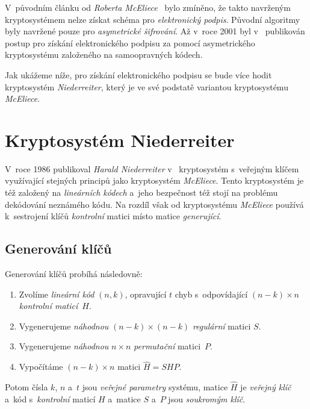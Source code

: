 \documentclass[thesis=M,czech,hidelinks]{FITthesis}[2012/06/26]
\newcommand{\0}{{\textcolor[gray]{0.75}{0}}}
\begin{document}
V~původním článku od \emph{Roberta McEliece}~\cite{McEliece} bylo zmíněno, že
takto navrženým kryptosystémem nelze získat schéma pro \emph{elektronický
podpis}.  Původní algoritmy byly navržené pouze pro \emph{asymetrické
šifrování}. Až v~roce 2001 byl v~\cite{Courtois} publikován postup pro získání
elektronického podpisu za pomocí asymetrického kryptosystému založeného na
samoopravných kódech.

Jak ukážeme níže, pro získání elektronického podpisu se bude více hodit
kryptosystém \emph{Niederreiter}, který je ve své podstatě variantou
kryptosystému \emph{McEliece}.



\section{Kryptosystém Niederreiter}\label{kap_niederreiter}

V~roce 1986 publikoval \emph{Harald Niederreiter} v~\cite{Niederreiter}
kryptosystém s~veřejným klíčem využívající stejných principů jako kryptosystém
\emph{McEliece}. Tento kryptosystém je též založený na \emph{lineárních kódech}
a~jeho bezpečnost též stojí na problému dekódování neznámého kódu. Na rozdíl
však od kryptosystému \emph{McEliece} používá k~sestrojení klíčů
\emph{kontrolní} matici místo matice \emph{generující}.


\subsection{Generování klíčů}

Generování klíčů probíhá následovně:

\begin{enumerate}
    \item Zvolíme \emph{lineární kód} $(n,k)$, opravující $t$ chyb
        s~odpovídající $(n-k) \times n$ \emph{kontrolní maticí}~$H$.
    \item Vygenerujeme \emph{náhodnou} $(n-k) \times (n-k)$ \emph{regulární}
        matici $S$.
    \item Vygenerujeme \emph{náhodnou} $n \times n$ \emph{permutační}
        matici~$P$.
    \item Vypočítáme $(n-k) \times n$ matici $\hat{H} = S H P$.
\end{enumerate}

Potom čísla $k$, $n$ a~$t$ jsou \emph{veřejné parametry} systému, matice
$\hat{H}$ je \emph{veřejný klíč} a~kód s~\emph{kontrolní} maticí $H$ a~matice
$S$ a~$P$ jsou \emph{soukromým klíč}.
\end{document}
